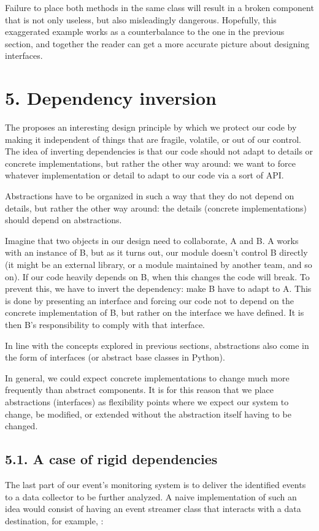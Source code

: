 \documentclass[a4paper,10pt,english]{sphinxmanual}
\begin{document}
Failure to place both methods in the same class will result in a broken component that is
not only useless, but also misleadingly dangerous. Hopefully, this exaggerated example
works as a counter\sphinxhyphen{}balance to the one in the previous section, and together the reader can
get a more accurate picture about designing interfaces.


\section{5. Dependency inversion}
\label{\detokenize{chapters/4_solid_principles/index:dependency-inversion}}
The  proposes an interesting design principle by
which we protect our code by making it independent of things that are fragile, volatile, or
out of our control. The idea of inverting dependencies is that our code should not adapt to
details or concrete implementations, but rather the other way around: we want to force
whatever implementation or detail to adapt to our code via a sort of API.

Abstractions have to be organized in such a way that they do not depend on details, but
rather the other way around: the details (concrete implementations) should depend on
abstractions.

Imagine that two objects in our design need to collaborate, A and B. A works with an
instance of B, but as it turns out, our module doesn’t control B directly (it might be an
external library, or a module maintained by another team, and so on). If our code heavily
depends on B, when this changes the code will break. To prevent this, we have to invert the
dependency: make B have to adapt to A. This is done by presenting an interface and forcing
our code not to depend on the concrete implementation of B, but rather on the interface we
have defined. It is then B’s responsibility to comply with that interface.

In line with the concepts explored in previous sections, abstractions also come in the form
of interfaces (or abstract base classes in Python).

In general, we could expect concrete implementations to change much more frequently
than abstract components. It is for this reason that we place abstractions (interfaces) as
flexibility points where we expect our system to change, be modified, or extended without
the abstraction itself having to be changed.


\subsection{5.1. A case of rigid dependencies}
\label{\detokenize{chapters/4_solid_principles/index:a-case-of-rigid-dependencies}}
The last part of our event’s monitoring system is to deliver the identified events to a data
collector to be further analyzed. A naive implementation of such an idea would consist of
having an event streamer class that interacts with a data destination, for example, :
\end{document}
